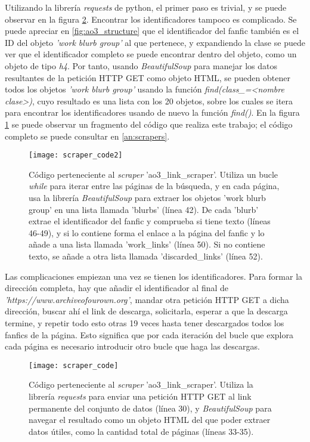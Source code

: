 \documentclass{pre-tfg}
\newcommand{\refToLinkScraperCode}{\ref{an:scrapers}}
\begin{document}
Utilizando la librería \textit{requests} de python, el primer paso es trivial, y se puede observar en la figura \ref{code:scraper1}. Encontrar los identificadores tampoco es complicado. Se puede apreciar en \ref{fig:ao3_structure} que el identificador del fanfic también es el ID del objeto \textit{'work blurb group'} al que pertenece, y expandiendo la clase se puede ver que el identificador completo se puede encontrar dentro del objeto, como un objeto de tipo \textit{h4}. Por tanto, usando \textit{BeautifulSoup} para manejar los datos resultantes de la petición HTTP GET como objeto HTML, se pueden obtener todos los objetos \textit{'work blurb group'} usando la función \textit{find(class\_=<nombre clase>)}, cuyo resultado es una lista con los 20 objetos, sobre los cuales se itera para encontrar los identificadores usando de nuevo la función \textit{find()}. En la figura \ref{code:scraper2} se puede observar un fragmento del código que realiza este trabajo; el código completo se puede consultar en \refToLinkScraperCode.

\begin{figure}
	\texttt{[image: scraper\_code2]}
	\caption{Código perteneciente al \textit{scraper} 'ao3\_link\_scraper'. Utiliza un bucle \textit{while} para iterar entre las páginas de la búsqueda, y en cada página, usa la librería \textit{BeautifulSoup} para extraer los objetos 'work blurb group' en una lista llamada 'blurbs' (línea 42). De cada 'blurb' extrae el identificador del fanfic y comprueba si tiene texto (líneas 46-49), y si lo contiene forma el enlace a la página del fanfic y lo añade a una lista llamada 'work\_links' (línea 50). Si no contiene texto, se añade a otra lista llamada 'discarded\_links' (línea 52).}
	\label{code:scraper2}
\end{figure}


Las complicaciones empiezan una vez se tienen los identificadores. Para formar la dirección completa, hay que añadir el identificador al final de \textit{'https://www.archiveofourown.org'}, mandar otra petición HTTP GET a dicha dirección, buscar ahí el link de descarga, solicitarla, esperar a que la descarga termine, y repetir todo esto otras 19 veces hasta tener descargados todos los fanfics de la página. Esto significa que por cada iteración del bucle que explora cada página es necesario introducir otro bucle que haga las descargas.

\begin{figure}
	\texttt{[image: scraper\_code]}
	\caption{Código perteneciente al \textit{scraper} 'ao3\_link\_scraper'. Utiliza la librería \textit{requests} para enviar una petición HTTP GET al link permanente del conjunto de datos (línea 30), y \textit{BeautifulSoup} para navegar el resultado como un objeto HTML del que poder extraer datos útiles, como la cantidad total de páginas (líneas 33-35).}
	\label{code:scraper1}
	\centering
\end{figure}
\end{document}

